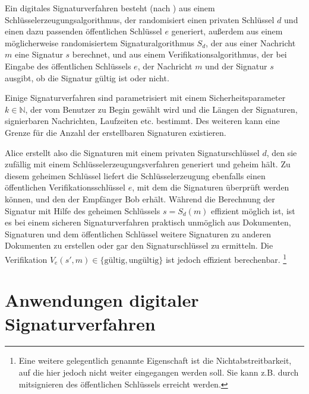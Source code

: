 \documentclass[a4paper,12pt,oneside]{scrreprt}
\begin{document}
Ein digitales Signaturverfahren besteht (nach \cite{Itkis04forwardsecurity, Goldwasser95adigital}) aus einem Schlüsselerzeugungsalgorithmus, der randomisiert einen privaten Schlüssel $d$ und einen dazu passenden öffentlichen Schlüssel $e$ generiert, außerdem aus einem möglicherweise randomisiertem Signaturalgorithmus $S_d$, der aus einer Nachricht $m$ eine Signatur $s$ berechnet, und aus einem Verifikationsalgorithmus, der bei Eingabe des öffentlichen Schlüssels $e$, der Nachricht $m$ und der Signatur $s$ ausgibt, ob die Signatur gültig ist oder nicht. 

Einige Signaturverfahren sind parametrisiert mit einem Sicherheitsparameter $k \in \mathbb{N}$, der vom Benutzer zu Begin gewählt wird und die Längen der Signaturen, signierbaren Nachrichten, Laufzeiten etc. bestimmt. Des weiteren kann eine Grenze für die Anzahl der erstellbaren Signaturen existieren. 

Alice erstellt also die Signaturen mit einem privaten Signaturschlüssel $d$, den sie zufällig mit einem Schlüsselerzeugungsverfahren generiert und geheim hält. Zu diesem geheimen Schlüssel liefert die Schlüsselerzeugung ebenfalls einen öffentlichen Verifikationsschlüssel $e$, mit dem die Signaturen überprüft werden können, und den der Empfänger Bob erhält. Während die Berechnung der Signatur mit Hilfe des geheimen Schlüssels $s = S_d(m)$ effizient möglich ist, ist es bei einem sicheren Signaturverfahren praktisch unmöglich aus Dokumenten, Signaturen und dem öffentlichen Schlüssel weitere Signaturen zu anderen Dokumenten zu erstellen oder gar den Signaturschlüssel zu ermitteln. Die Verifikation $V_e(s', m) \in \{\text{gültig}, \text{ungültig}\}$ ist jedoch effizient berechenbar. \footnote{Eine weitere gelegentlich genannte Eigenschaft ist die Nichtabstreitbarkeit, auf die hier jedoch nicht weiter eingegangen werden soll. Sie kann z.B. durch mitsignieren des öffentlichen Schlüssels erreicht werden. }

\section{Anwendungen digitaler Signaturverfahren}
\end{document}
